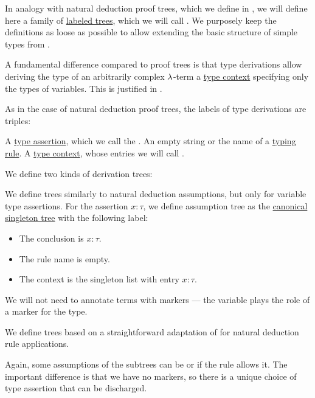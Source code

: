 \begin{definition}\label{def:type_derivation_tree}\mimprovised
  In analogy with natural deduction proof trees, which we define in , we will define here a family of \hyperref[def:labeled_tree]{labeled trees}, which we will call . We purposely keep the definitions as loose as possible to allow extending the basic structure of simple types from .

  A fundamental difference compared to proof trees is that type derivations allow deriving the type of an arbitrarily complex \( \mathrm{\lambda} \)-term a \hyperref[def:type_context]{type context} specifying only the types of variables. This is justified in .

  As in the case of natural deduction proof trees, the labels of type derivations are triples:
  \begin{thmenum}[series=def:type_derivation_tree]
     A \hyperref[def:type_assertion]{type assertion}, which we call the .
     An empty string or the name of a \hyperref[def:simple_typing_rule]{typing rule}.
     A \hyperref[def:type_context]{type context}, whose entries we will call .
  \end{thmenum}

  We define two kinds of derivation trees:
  \begin{thmenum}[resume=def:type_derivation_tree]
     We define  trees similarly to natural deduction assumptions, but only for variable type assertions. For the assertion \( x: \tau \), we define assumption tree as the \hyperref[def:canonical_singleton_tree]{canonical singleton tree} with the following label:
    \begin{itemize}
      \item The conclusion is \( x: \tau \).
      \item The rule name is empty.
      \item The context is the singleton list with entry \( x: \tau \).
    \end{itemize}

    We will not need to annotate terms with markers --- the variable plays the role of a marker for the type.

     We define  trees based on a straightforward adaptation of  for natural deduction rule applications.

    Again, some assumptions of the subtrees can be  or  if the rule allows it. The important difference is that we have no markers, so there is a unique choice of type assertion that can be discharged.
  \end{thmenum}
\end{definition}

